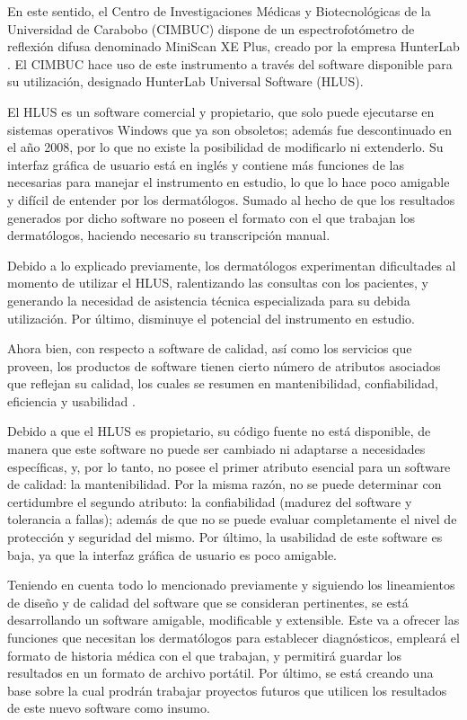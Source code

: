 \documentclass[conference]{IEEEtran}
\begin{document}
En este sentido, el Centro de Investigaciones M\'{e}dicas y Biotecnol\'{o}gicas de la Universidad de Carabobo \mbox{(CIMBUC)} dispone de un espectrofot\'{o}metro de reflexi\'{o}n difusa \mbox{denominado} MiniScan XE Plus, creado por la empresa HunterLab \cite{HunterLab}. El CIMBUC hace uso de este instrumento a trav\'{e}s del software disponible para su utilizaci\'{o}n, designado HunterLab Universal Software (HLUS)\cite{HunterLab-manual}.

El HLUS es un software \mbox{comercial} y propietario, que solo puede ejecutarse en \mbox{sistemas} \mbox{operativos} Windows que ya son obsoletos; adem\'{a}s fue \mbox{descontinuado} en el a\~{n}o 2008, por lo que no existe la posibilidad de modificarlo ni extenderlo. Su interfaz gr\'{a}fica de usuario est\'{a} en ingl\'{e}s y contiene m\'{a}s funciones de las necesarias para manejar el instrumento en estudio, lo que lo hace poco amigable y dif\'{i}cil de entender por los dermat\'{o}logos. Sumado al hecho de que los resultados generados por dicho software no poseen el formato con el que trabajan los dermat\'{o}logos, haciendo necesario su transcripci\'{o}n manual. 

Debido a lo explicado previamente, los dermat\'{o}logos experimentan dificultades al momento de utilizar el HLUS, ralentizando las consultas con los pacientes, y generando la necesidad de asistencia t\'{e}cnica especializada para su debida utilizaci\'{o}n. Por \'{u}ltimo, disminuye el potencial del instrumento en estudio.

Ahora bien, con respecto a software de calidad, as\'{i} como los servicios que proveen, los productos de software tienen cierto n\'{u}mero de atributos asociados que reflejan su calidad, los cuales se resumen en mantenibilidad, confiabilidad, eficiencia y usabilidad \cite{Sommerville}.

Debido a que el HLUS es \mbox{propietario}, su c\'{o}digo fuente no est\'{a} disponible, de manera que este software no puede ser cambiado ni adaptarse a necesidades espec\'{i}ficas, y, por lo tanto, no posee el primer atributo esencial para un software de calidad: la mantenibilidad. Por la misma raz\'{o}n, no se puede determinar con certidumbre el segundo atributo: la confiabilidad (madurez del software y tolerancia a fallas); adem\'{a}s de que no se puede evaluar completamente el nivel de protecci\'{o}n y seguridad del mismo. Por \'{u}ltimo, la usabilidad de este software es baja, ya que la interfaz gr\'{a}fica de usuario es poco amigable.

Teniendo en cuenta todo lo mencionado previamente y siguiendo los lineamientos de dise\~{n}o y de calidad del \mbox{software} que se consideran pertinentes, se est\'{a} desarrollando un \mbox{software} amigable, modificable y extensible. Este va a ofrecer las funciones que necesitan los dermat\'{o}logos para establecer \mbox{diagn\'{o}sticos}, emplear\'{a} el formato de historia m\'{e}dica con el que trabajan, y permitir\'{a} guardar los resultados en un formato de archivo port\'{a}til. Por \'{u}ltimo, se est\'{a} creando una base sobre la cual prodr\'{a}n trabajar proyectos futuros que utilicen los resultados de este nuevo software como insumo.
\end{document}
